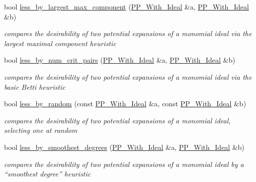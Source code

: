 \begin{DoxyCompactItemize}
bool \hyperlink{namespace_dynamic___engine_acbc39a829236f4021485cc631f030264}{less\+\_\+by\+\_\+largest\+\_\+max\+\_\+component} (\hyperlink{group___g_b_computation_class_dynamic___engine_1_1_p_p___with___ideal}{P\+P\+\_\+\+With\+\_\+\+Ideal} \&a, \hyperlink{group___g_b_computation_class_dynamic___engine_1_1_p_p___with___ideal}{P\+P\+\_\+\+With\+\_\+\+Ideal} \&b)
\begin{DoxyCompactList}\small\item\em compares the desirability of two potential expansions of a monomial ideal via the largest maximal component heuristic \end{DoxyCompactList}\item 
bool \hyperlink{namespace_dynamic___engine_ab4b77c648c1c2892cffba4dcf2a6d80a}{less\+\_\+by\+\_\+num\+\_\+crit\+\_\+pairs} (\hyperlink{group___g_b_computation_class_dynamic___engine_1_1_p_p___with___ideal}{P\+P\+\_\+\+With\+\_\+\+Ideal} \&a, \hyperlink{group___g_b_computation_class_dynamic___engine_1_1_p_p___with___ideal}{P\+P\+\_\+\+With\+\_\+\+Ideal} \&b)
\begin{DoxyCompactList}\small\item\em compares the desirability of two potential expansions of a monomial ideal via the basic Betti heuristic \end{DoxyCompactList}\item 
bool \hyperlink{namespace_dynamic___engine_a119c751f93ea0a16eb27f4b08de65bb0}{less\+\_\+by\+\_\+random} (const \hyperlink{group___g_b_computation_class_dynamic___engine_1_1_p_p___with___ideal}{P\+P\+\_\+\+With\+\_\+\+Ideal} \&a, const \hyperlink{group___g_b_computation_class_dynamic___engine_1_1_p_p___with___ideal}{P\+P\+\_\+\+With\+\_\+\+Ideal} \&b)
\begin{DoxyCompactList}\small\item\em compares the desirability of two potential expansions of a monomial ideal, selecting one at random \end{DoxyCompactList}\item 
bool \hyperlink{namespace_dynamic___engine_aa27b3fbb646d1d0f5d35de5a69e1cb29}{less\+\_\+by\+\_\+smoothest\+\_\+degrees} (\hyperlink{group___g_b_computation_class_dynamic___engine_1_1_p_p___with___ideal}{P\+P\+\_\+\+With\+\_\+\+Ideal} \&a, \hyperlink{group___g_b_computation_class_dynamic___engine_1_1_p_p___with___ideal}{P\+P\+\_\+\+With\+\_\+\+Ideal} \&b)
\begin{DoxyCompactList}\small\item\em compares the desirability of two potential expansions of a monomial ideal by a ``smoothest degree'' heuristic \end{DoxyCompactList}\item 

\end{DoxyCompactItemize}

